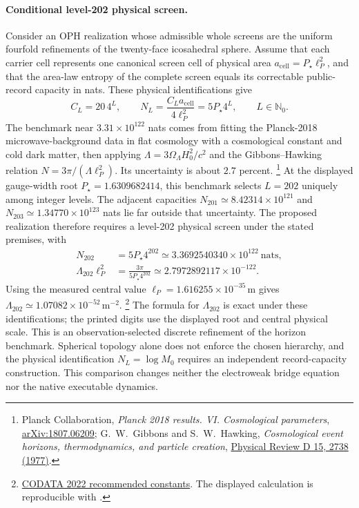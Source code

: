 \paragraph{Conditional level-202 physical screen.}
Consider an OPH realization whose admissible whole screens are the uniform
fourfold refinements of the twenty-face icosahedral sphere. Assume that each
carrier cell represents one canonical screen cell of physical area
\(a_{\mathrm{cell}}=P_\star\ell_P^2\), and that the area-law entropy of the
complete screen equals its correctable public-record capacity in nats.
These physical identifications give
\[
 C_L=20\,4^L,\qquad
 N_L=\frac{C_La_{\mathrm{cell}}}{4\ell_P^2}
     =5P_\star4^L,\qquad L\in\mathbb N_0.
\]
The benchmark near \(3.31\times10^{122}\) nats comes from fitting the
Planck-2018 microwave-background data in flat cosmology with a cosmological
constant and cold dark matter, then applying
\(\Lambda=3\Omega_\Lambda H_0^2/c^2\) and the Gibbons--Hawking relation
\(N=3\pi/(\Lambda\ell_P^2)\). Its uncertainty is about \(2.7\) percent.%
\footnote{Planck Collaboration, \emph{Planck 2018 results. VI.
Cosmological parameters}, \href{https://arxiv.org/abs/1807.06209}{arXiv:1807.06209};
G.\ W.\ Gibbons and S.\ W.\ Hawking, \emph{Cosmological event horizons,
thermodynamics, and particle creation},
\href{https://doi.org/10.1103/PhysRevD.15.2738}{Physical Review D 15, 2738 (1977)}.}
At the displayed gauge-width root \(P_\star=1.6309682414\), this benchmark
selects \(L=202\) uniquely among integer levels. The adjacent capacities
\(N_{201}\simeq8.42314\times10^{121}\) and
\(N_{203}\simeq1.34770\times10^{123}\) nats lie far outside that uncertainty.
The proposed realization therefore requires a level-202 physical screen
under the stated premises, with
\begin{align}
 N_{202}&=5P_\star4^{202}
          \simeq3.3692540340\times10^{122}\ \text{nats},
          \label{eq:discrete-screen-capacity}\\
 \Lambda_{202}\ell_P^2
       &=\frac{3\pi}{5P_\star4^{202}}
          \simeq2.7972892117\times10^{-122}.
          \label{eq:discrete-screen-lambda}
\end{align}
Using the measured central value
\(\ell_P=1.616255\times10^{-35}\,\mathrm m\) gives
\(\Lambda_{202}\simeq1.07082\times10^{-52}\,\mathrm m^{-2}\).%
\footnote{\href{https://physics.nist.gov/cuu/pdf/all.pdf}{CODATA 2022 recommended
constants}. The displayed calculation is reproducible with
.}
The formula for \(\Lambda_{202}\) is exact under these identifications;
the printed digits use the displayed root and central physical scale.
This is an observation-selected discrete refinement of the horizon
benchmark. Spherical topology alone does not enforce the chosen hierarchy,
and the physical identification \(N_L=\log M_0\) requires an independent
record-capacity construction. This comparison changes neither the
electroweak bridge equation nor the native executable dynamics.
